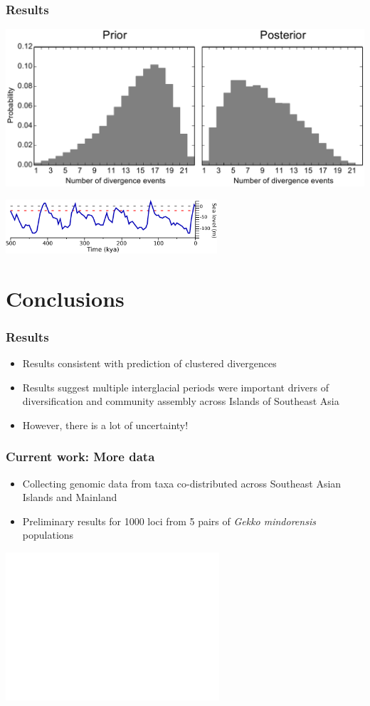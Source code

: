 \begin{frame}
    \frametitle{Results}
    \centerline{
    \includegraphics[width=\textwidth]{../../empirical-analyses/plots/philippines-dpp-psi-posterior-prior.pdf}}
    \smallskip
    \centerline{
    \includegraphics[height=2cm]{../images/sea-level-only.pdf}}
\end{frame}

\section{Conclusions}

\begin{frame}
    \frametitle{Results}
    \begin{itemize}
        \item<1-> Results consistent with prediction of clustered
            divergences
        \item<2-> Results suggest multiple interglacial periods were important
            drivers of diversification and community assembly across Islands of
            Southeast Asia
        \item<3-> However, there is a lot of uncertainty!
    \end{itemize}
\end{frame}


\begin{frame}[t]
    \frametitle{Current work: More data}
    \begin{minipage}[t][0.15\textheight][c]{\linewidth}
    \begin{itemize}
        \item<1-> Collecting genomic data from taxa co-distributed across
            Southeast Asian Islands and Mainland
        \item<2-> Preliminary results for 1000 loci from 5 pairs of \emph{Gekko
                mindorensis} populations
    \end{itemize}
    \end{minipage}

    \begin{center}
        \includegraphics<2->[height=5.5cm]{../images/number-of-divs-gekko-mindorensis.pdf}
    \end{center}
\end{frame}

